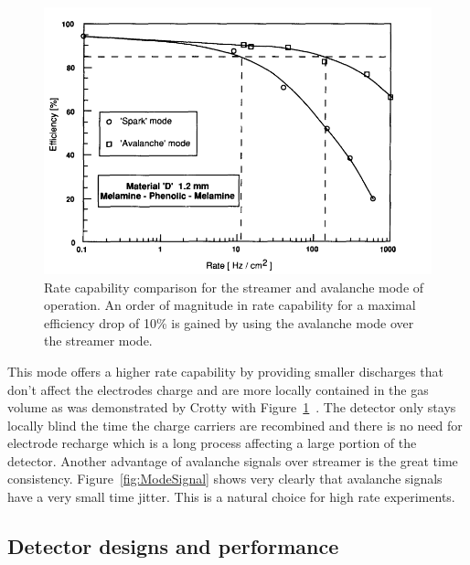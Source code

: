 	\begin{figure}[H]
		\centering
		\includegraphics[width = \plotwidth]{fig/chapt3/Rate_Mode_Comparison.png}
		\caption{\label{fig:ModeRate} Rate capability comparison for the streamer and avalanche mode of operation. An order of magnitude in rate capability for a maximal efficiency drop of 10\% is gained by using the avalanche mode over the streamer mode.}
	\end{figure}
	
	This mode offers a higher rate capability by providing smaller discharges that don't affect the electrodes charge and are more locally contained in the gas volume as was demonstrated by Crotty with Figure~\ref{fig:ModeRate}~\cite{CROTTY93}. The detector only stays locally blind the time the charge carriers are recombined and there is no need for electrode recharge which is a long process affecting a large portion of the detector. Another advantage of avalanche signals over streamer is the great time consistency. Figure~\ref{fig:ModeSignal} shows very clearly that avalanche signals have a very small time jitter. This is a natural choice for high rate experiments.
	
	\subsection{Detector designs and performance}
	\label{chapt3:ssec:design}
	
